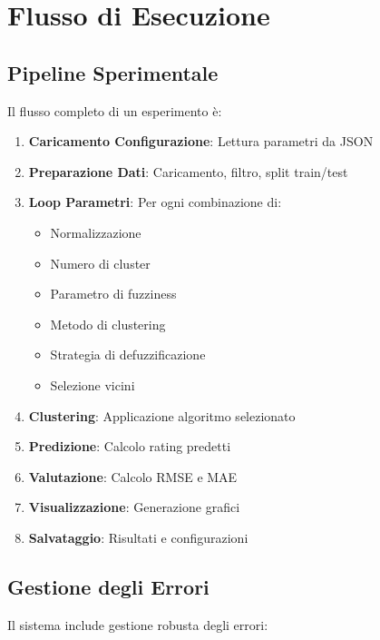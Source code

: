 \section{Flusso di Esecuzione}

\subsection{Pipeline Sperimentale}

Il flusso completo di un esperimento è:

\begin{enumerate}
    \item \textbf{Caricamento Configurazione}: Lettura parametri da JSON
    \item \textbf{Preparazione Dati}: Caricamento, filtro, split train/test
    \item \textbf{Loop Parametri}: Per ogni combinazione di:
        \begin{itemize}
            \item Normalizzazione
            \item Numero di cluster
            \item Parametro di fuzziness
            \item Metodo di clustering
            \item Strategia di defuzzificazione
            \item Selezione vicini
        \end{itemize}
    \item \textbf{Clustering}: Applicazione algoritmo selezionato
    \item \textbf{Predizione}: Calcolo rating predetti
    \item \textbf{Valutazione}: Calcolo RMSE e MAE
    \item \textbf{Visualizzazione}: Generazione grafici
    \item \textbf{Salvataggio}: Risultati e configurazioni
\end{enumerate}

\subsection{Gestione degli Errori}

Il sistema include gestione robusta degli errori:

